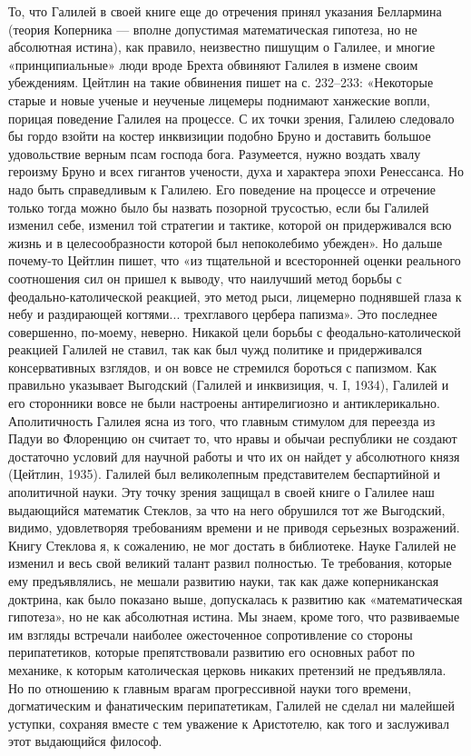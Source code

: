 То, что Галилей в своей книге еще до отречения принял указания Беллармина
(теория Коперника --- вполне допустимая математическая гипотеза, но не абсолютная
истина), как правило, неизвестно пишущим о Галилее, и многие «принципиальные»
люди вроде Брехта обвиняют Галилея в измене своим убеждениям. Цейтлин на такие
обвинения пишет на с. 232--233: «Некоторые старые и новые ученые и неученые
лицемеры поднимают ханжеские вопли, порицая поведение Галилея на процессе. С их
точки зрения, Галилею следовало бы гордо взойти на костер инквизиции подобно
Бруно и доставить большое удовольствие верным псам господа бога. Разумеется,
нужно воздать хвалу героизму Бруно и всех гигантов учености, духа и характера
эпохи Ренессанса. Но надо быть справедливым к Галилею. Его поведение на
процессе и отречение только тогда можно было бы назвать позорной трусостью,
если бы Галилей изменил себе, изменил той стратегии и тактике, которой он
придерживался всю жизнь и в целесообразности которой был непоколебимо убежден».
Но дальше почему-то Цейтлин пишет, что «из тщательной и всесторонней оценки
реального соотношения сил он пришел к выводу, что наилучший метод борьбы с
феодально-католической реакцией, это метод рыси, лицемерно поднявшей глаза к
небу и раздирающей когтями... трехглавого цербера папизма». Это последнее
совершенно, по-моему, неверно. Никакой цели борьбы с феодально-католической
реакцией Галилей не ставил, так как был чужд политике и придерживался
консервативных взглядов, и он вовсе не стремился бороться с папизмом. Как
правильно указывает Выгодский (Галилей и инквизиция, ч. I, 1934), Галилей и его
сторонники вовсе не были настроены антирелигиозно и антиклерикально.
Аполитичность Галилея ясна из того, что главным стимулом для переезда из Падуи
во Флоренцию он считает то, что нравы и обычаи республики не создают достаточно
условий для научной работы и что их он найдет у абсолютного князя (Цейтлин,
1935). Галилей был великолепным представителем беспартийной и аполитичной
науки. Эту точку зрения защищал в своей книге о Галилее наш выдающийся
математик Стеклов, за что на него обрушился тот же Выгодский, видимо,
удовлетворяя требованиям времени и не приводя серьезных возражений. Книгу
Стеклова я, к сожалению, не мог достать в библиотеке. Науке Галилей не изменил
и весь свой великий талант развил полностью. Те требования, которые ему
предъявлялись, не мешали развитию науки, так как даже коперниканская доктрина,
как было показано выше, допускалась к развитию как «математическая гипотеза»,
но не как абсолютная истина. Мы знаем, кроме того, что развиваемые им взгляды
встречали наиболее ожесточенное сопротивление со стороны перипатетиков, которые
препятствовали развитию его основных работ по механике, к которым католическая
церковь никаких претензий не предъявляла. Но по отношению к главным врагам
прогрессивной науки того
времени, догматическим и фанатическим перипатетикам, Галилей не сделал ни
малейшей уступки, сохраняя вместе с тем уважение к Аристотелю, как того и
заслуживал этот выдающийся философ.


